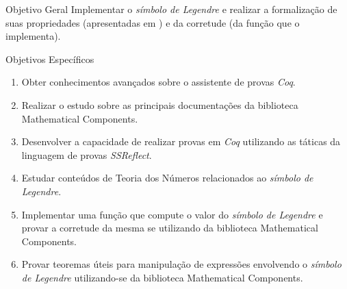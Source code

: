 \begin{frame}{Objetivo Geral}
    Implementar o \textit{símbolo de Legendre} e realizar a formalização de suas propriedades (apresentadas em \cite{book:2399854}) e da corretude (da função que o implementa). 
\end{frame}

\begin{frame}{Objetivos Específicos}
    \begin{enumerate}
            \item Obter conhecimentos avançados sobre o assistente de provas \textit{Coq}.
            \item Realizar o estudo sobre as principais documentações da biblioteca Mathematical Components.
            \item Desenvolver a capacidade de realizar provas em \textit{Coq} utilizando as táticas da linguagem de provas \textit{SSReflect}.
            \item Estudar conteúdos de Teoria dos Números relacionados ao \textit{símbolo de Legendre}.
            \item Implementar uma função que compute o valor do \textit{símbolo de Legendre} e provar a corretude da mesma se utilizando da biblioteca Mathematical Components.
            \item Provar teoremas úteis para manipulação de expressões envolvendo o \textit{símbolo de Legendre} utilizando-se da biblioteca Mathematical Components.
    \end{enumerate}
\end{frame}